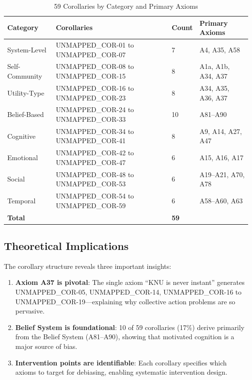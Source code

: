 \begin{table}[htbp]
\centering
\caption{59 Corollaries by Category and Primary Axioms}
\label{tab:cor-summary}
\begin{tabular}{llll}
\toprule
\textbf{Category} & \textbf{Corollaries} & \textbf{Count} & \textbf{Primary Axioms} \\
\midrule
System-Level & UNMAPPED_COR-01 to UNMAPPED_COR-07 & 7 & A4, A35, A58 \\
Self-Community & UNMAPPED_COR-08 to UNMAPPED_COR-15 & 8 & A1a, A1b, A34, A37 \\
Utility-Type & UNMAPPED_COR-16 to UNMAPPED_COR-23 & 8 & A34, A35, A36, A37 \\
Belief-Based & UNMAPPED_COR-24 to UNMAPPED_COR-33 & 10 & A81--A90 \\
Cognitive & UNMAPPED_COR-34 to UNMAPPED_COR-41 & 8 & A9, A14, A27, A47 \\
Emotional & UNMAPPED_COR-42 to UNMAPPED_COR-47 & 6 & A15, A16, A17 \\
Social & UNMAPPED_COR-48 to UNMAPPED_COR-53 & 6 & A19--A21, A70, A78 \\
Temporal & UNMAPPED_COR-54 to UNMAPPED_COR-59 & 6 & A58--A60, A63 \\
\midrule
\textbf{Total} & & \textbf{59} & \\
\bottomrule
\end{tabular}
\end{table}

\subsection{Theoretical Implications}

The corollary structure reveals three important insights:

\begin{enumerate}
    \item \textbf{Axiom A37 is pivotal}: The single axiom ``KNU is never instant'' generates UNMAPPED_COR-05, UNMAPPED_COR-14, UNMAPPED_COR-16 to UNMAPPED_COR-19---explaining why collective action problems are so pervasive.
    
    \item \textbf{Belief System is foundational}: 10 of 59 corollaries (17\%) derive primarily from the Belief System (A81--A90), showing that motivated cognition is a major source of bias.
    
    \item \textbf{Intervention points are identifiable}: Each corollary specifies which axioms to target for debiasing, enabling systematic intervention design.
\end{enumerate}

